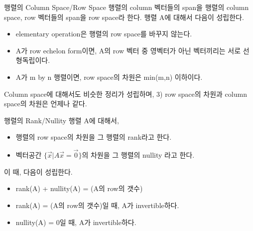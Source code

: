 \documentclass{beamer}
\begin{document}


\begin{frame}{행렬의 Column Space/Row Space}
행렬의 column 벡터들의 span을 행렬의 column space, row 벡터들의 span을 row space라 한다. 행렬 A에 대해서 다음이 성립한다. 

\begin{itemize} 
\item elementary operation은 행렬의 row space를 바꾸지 않는다. 
\item A가 row echelon form이면, A의 row 벡터 중 영벡터가 아닌 벡터끼리는 서로 선형독립이다. 
\item A가 m by n 행렬이면, row space의 차원은 min(m,n) 이하이다. 
\end{itemize}

Column space에 대해서도 비슷한 정리가 성립하며, 3) row space의 차원과 column space의 차원은 언제나 같다. 
\end{frame}







\begin{frame}{행렬의 Rank/Nullity}
행렬 A에 대해서, 

\begin{itemize} 
\item 행렬의 row space의 차원을 그 행렬의 rank라고 한다. 
\item 벡터공간 $\{\vec{x}|A\vec{x} = \vec{0}\}$의 차원을 그 행렬의 nullity 라고 한다. 
\end{itemize}

이 때, 다음이 성립한다. 

\begin{itemize} 
\item rank(A) + nullity(A) = (A의 row의 갯수) 
\item rank(A) = (A의 row의 갯수)일 때, A가 invertible하다. 
\item nullity(A) = 0일 때, A가 invertible하다. 
\end{itemize}


\end{frame}
\end{document}
